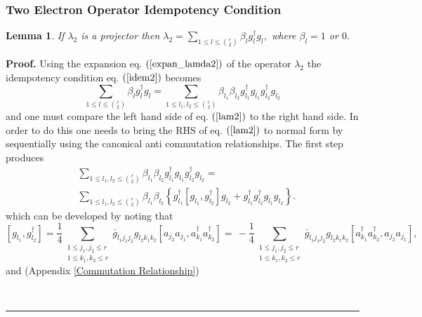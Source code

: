 \documentclass[aps,preprint,amsfonts,amssymb,showpacs,showkeys]{revtex4}%
\newtheorem{lemma}[theorem]{Lemma}
\newenvironment{proof}[1][Proof]{\noindent\textbf{#1.} }{\ \rule{0.5em}{0.5em}}
\begin{document}
\subsubsection{Two Electron Operator Idempotency Condition}

\begin{lemma}
If $\lambda_{2}$ is a projector then $\lambda_{2}=\sum\limits_{1\leq
l\leq\binom{r}{2}}\beta_{l}g_{l}^{\dagger}g_{l},$ where $\beta_{l}=1$ or $0.$
\end{lemma}

\begin{proof}
Using the expansion eq. $\left(  \ref{expan_lamda2}\right)  $ of the operator
$\lambda_{2}$ the idempotency condition eq. $\left(  \ref{idem2}\right)  $
becomes
\begin{equation}
\sum_{1\leq l\leq\binom{r}{2}}\beta_{l}g_{l}^{\dagger}g_{l}=\sum_{1\leq
l_{1},l_{2}\leq\binom{r}{2}}\beta_{l_{1}}\beta_{l_{2}}g_{l_{1}}^{\dagger
}g_{l_{1}}g_{l_{2}}^{\dagger}g_{l_{2}} \label{lam2}%
\end{equation}
and one must compare the left hand side of eq. $\left(  \ref{lam2}\right)  $
to the right hand side. In order to do this one needs to bring the RHS of eq.
$\left(  \ref{lam2}\right)  $ to normal form by sequentially using the
canonical anti commutation relationships. The first step produces
\begin{align}
&  \sum_{1\leq l_{1},l_{2}\leq\binom{r}{2}}\beta_{l_{1}}\beta_{l_{2}}g_{l_{1}%
}^{\dagger}g_{l_{1}}g_{l_{2}}^{\dagger}g_{l_{2}}=\nonumber\\
&  \sum_{1\leq l_{1},l_{2}\leq\binom{r}{2}}\beta_{l_{1}}\beta_{l_{2}}\left\{
g_{l_{1}}^{\dagger}\left[  g_{l_{1}},g_{l_{2}}^{\dagger}\right]  g_{l_{2}%
}+g_{l_{1}}^{\dagger}g_{l_{2}}^{\dagger}g_{l_{1}}g_{l_{2}}\right\}  .
\label{normform}%
\end{align}
which can be developed by noting that%
\begin{equation}
\left[  g_{l_{1}},g_{l_{2}}^{\dagger}\right]  =\frac{1}{4}\sum
_{\substack{1\leq j_{1},j_{2}\leq r\\1\leq k_{1},k_{2}\leq r}}\bar{g}%
_{l_{1}j_{1}j_{2}}g_{l_{2}k_{1}k_{2}}\left[  a_{j_{2}}a_{j_{1}},a_{k_{1}%
}^{\dagger}a_{k_{2}}^{\dagger}\right]  =\,-\frac{1}{4}\sum_{\substack{1\leq
j_{1},j_{2}\leq r\\1\leq k_{1},k_{2}\leq r}}\bar{g}_{l_{1}j_{1}j_{2}}%
g_{l_{2}k_{1}k_{2}}\left[  a_{k_{1}}^{\dagger}a_{k_{2}}^{\dagger},a_{j_{2}%
}a_{j_{1}}\right]  ,
\end{equation}
and (Appendix \ref{Commutation Relationship})

\end{proof}
\end{document}
